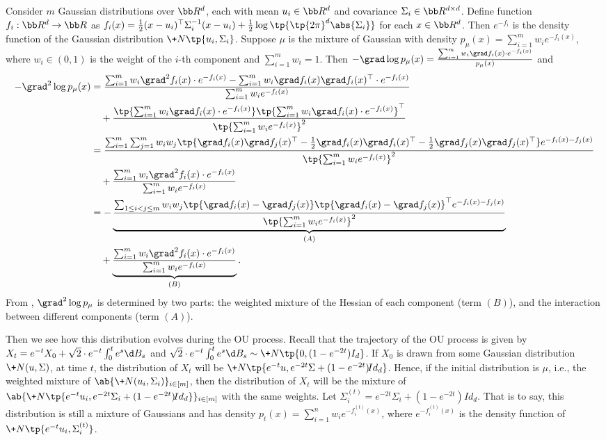 Consider $m$ Gaussian distributions over $\bb R^d$, each with mean $u_i\in \bb R^d$ and covariance $\Sigma_i\in \bb R^{d\times d}$. Define function $f_i:\bb R^d\to \bb R$ as $f_i(x) = \frac{1}{2}(x-u_i)^{\top}\Sigma_i^{-1}(x-u_i) + \frac{1}{2}\log\tp{\tp{2\pi}^{d} \abs{\Sigma_i}}$ for each $x\in \bb R^d$. Then $e^{-f_i}$ is the density function of the Gaussian distribution $\+N\tp{u_i,\Sigma_i}$. Suppose $\mu$ is the mixture of Gaussian with density $p_{\mu}(x) = \sum_{i=1}^m w_i e^{-f_i(x)}$, where $w_i\in(0,1)$ is the weight of the $i$-th component and $\sum_{i=1}^m w_i=1$. Then $-\grad \log p_{\mu}(x) = \frac{\sum_{i=1}^m w_i\grad f_i(x)\cdot e^{-f_i(x)}}{p_{\mu}(x)}$ and 
\begin{align}
    -\grad^2 \log p_{\mu}(x) &= \frac{\sum_{i=1}^m w_i\grad^2 f_i(x)\cdot e^{-f_i(x)} - \sum_{i=1}^m w_i\grad f_i(x)\grad f_i(x)^{\top}\cdot e^{-f_i(x)}}{\sum_{i=1}^m w_i e^{-f_i(x)}} \notag  \\
    &\quad + \frac{\tp{\sum_{i=1}^m w_i\grad f_i(x)\cdot e^{-f_i(x)}}\tp{\sum_{i=1}^m w_i\grad f_i(x)\cdot e^{-f_i(x)}}^{\top}}{\tp{\sum_{i=1}^m w_i e^{-f_i(x)}}^2} \notag \\
    &= \frac{\sum_{i=1}^m\sum_{j=1}^m w_iw_j \tp{\grad f_i(x) \grad f_j(x)^{\top} - \frac{1}{2}\grad f_i(x) \grad f_i(x)^{\top} - \frac{1}{2}\grad f_j(x) \grad f_j(x)^{\top}} e^{-f_i(x)-f_j(x)}}{\tp{\sum_{i=1}^m w_i e^{-f_i(x)}}^2} \notag \\
    &\quad + \frac{\sum_{i=1}^m w_i\grad^2 f_i(x)\cdot e^{-f_i(x)} }{\sum_{i=1}^m w_i e^{-f_i(x)}} \notag \\
    &= - \underbrace{\frac{\sum_{1\leq i<j\leq m} w_iw_j \tp{\grad f_i(x) - \grad f_j(x)}\tp{\grad f_i(x) - \grad f_j(x)}^{\top} e^{-f_i(x)-f_j(x)}}{\tp{\sum_{i=1}^m w_i e^{-f_i(x)}}^2}}_{(A)} \notag \\
    &\quad + \underbrace{\frac{\sum_{i=1}^m w_i\grad^2 f_i(x)\cdot e^{-f_i(x)} }{\sum_{i=1}^m w_i e^{-f_i(x)}}}_{(B)}. \label{eq:smooth1}
\end{align}
From , $\grad^2 \log p_{\mu}$ is determined by two parts: the weighted mixture of the Hessian of each component (term $(B)$), and the interaction between different components (term $(A)$).

Then we see how this distribution evolves during the OU process. Recall that the trajectory of the OU process is given by $X_t = e^{-t}X_0 + \sqrt{2}\cdot e^{-t}\int_{0}^t e^s \d B_s$ and $
\sqrt{2}\cdot e^{-t}\int_{0}^t e^s \d B_s \sim \+N\tp{0, (1-e^{-2t})I_d}$. If $X_0$ is drawn from some Gaussian distribution $\+N(u,\Sigma)$, at time $t$, the distribution of $X_t$ will be $\+N\tp{e^{-t}u, e^{-2t}\Sigma + (1-e^{-2t})\!{Id}_d}$. Hence, if the initial distribution is $\mu$, i.e., the weighted mixture of $\ab\{\+N(u_i, \Sigma_i)\}_{i\in[m]}$, then the distribution of $X_t$ will be the mixture of $\ab\{\+N\tp{e^{-t}u_i, e^{-2t}\Sigma_i + (1-e^{-2t})\!{Id}_d} \}_{i\in[m]}$ with the same weights. Let $\Sigma_i^{(t)} =  e^{-2t}\Sigma_i + (1-e^{-2t})\!{Id}_d$. That is to say, this distribution is still a mixture of Gaussians and has density $p_t(x) = \sum_{i=1}^n w_i e^{-f^{(t)}_i(x)}$, where $e^{-f^{(t)}_i(x)}$ is the density function of $\+N\tp{e^{-t}u_i, \Sigma_i^{(t)}}$.
 


